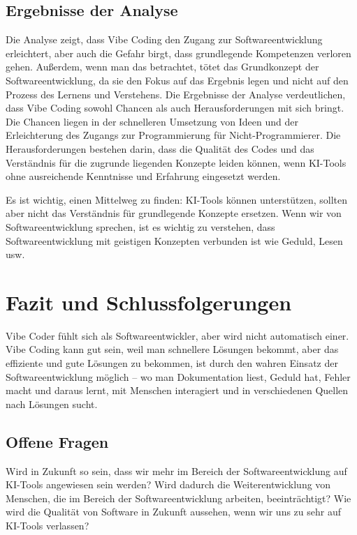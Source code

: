 \documentclass[paper=a4,fontsize=12pt,ngerman]{scrartcl}
\begin{document}
\subsection{Ergebnisse der Analyse}
Die Analyse zeigt, dass Vibe Coding den Zugang zur Softwareentwicklung erleichtert, aber auch die Gefahr birgt, dass grundlegende Kompetenzen verloren gehen.
Außerdem, wenn man das betrachtet, tötet das Grundkonzept der Softwareentwicklung, da sie den Fokus auf das Ergebnis legen und nicht auf den Prozess des Lernens und Verstehens.
Die Ergebnisse der Analyse verdeutlichen, dass Vibe Coding sowohl Chancen als auch Herausforderungen mit sich bringt.
Die Chancen liegen in der schnelleren Umsetzung von Ideen und der Erleichterung des Zugangs zur Programmierung für Nicht-Programmierer.
Die Herausforderungen bestehen darin, dass die Qualität des Codes und das Verständnis für die zugrunde liegenden Konzepte leiden können, wenn KI-Tools ohne ausreichende Kenntnisse und Erfahrung eingesetzt werden.

Es ist wichtig, einen Mittelweg zu finden: KI-Tools können unterstützen, sollten aber nicht das Verständnis für grundlegende Konzepte ersetzen.
Wenn wir von Softwareentwicklung sprechen, ist es wichtig zu verstehen, dass Softwareentwicklung mit geistigen Konzepten verbunden ist wie Geduld, Lesen usw.

\clearpage
\section{Fazit und Schlussfolgerungen}
Vibe Coder fühlt sich als Softwareentwickler, aber wird nicht automatisch einer. 
Vibe Coding kann gut sein, weil man schnellere Lösungen bekommt, aber das effiziente und gute Lösungen zu bekommen, ist durch den wahren Einsatz der Softwareentwicklung möglich – wo man Dokumentation liest, Geduld hat, Fehler macht und daraus lernt, mit Menschen interagiert und in verschiedenen Quellen nach Lösungen sucht.

\subsection{Offene Fragen}
Wird in Zukunft so sein, dass wir mehr im Bereich der Softwareentwicklung auf KI-Tools angewiesen sein werden?  
Wird dadurch die Weiterentwicklung von Menschen, die im Bereich der Softwareentwicklung arbeiten, beeinträchtigt?  
Wie wird die Qualität von Software in Zukunft aussehen, wenn wir uns zu sehr auf KI-Tools verlassen?
\end{document}
